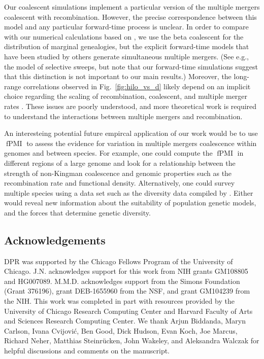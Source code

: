 \documentclass[11pt, letterpaper]{article}   	%
\newcommand{\fig}[1]{Fig.~\ref{#1}}
\DeclareMathOperator{\fpmi}{fPMI}
\begin{document}
Our coalescent simulations implement a particular version of the multiple mergers coalescent with recombination.
However, the precise correspondence between this model and any particular forward-time process is unclear.
In order to compare with our numerical calculations based on \textcite{BirknerEtAl2013}, we use the beta coalescent for the distribution of marginal genealogies, but the explicit forward-time models that have been studied by others generate simultaneous multiple mergers.
(See e.g., the \cite{DurrettSchweinsberg2005} model of selective sweeps, but note that our forward-time simulations suggest that this distinction is not important to our main results.)
Moreover, the long-range correlations observed in \fig{fig:hilo_vs_d} likely depend on an implicit choice regarding the scaling of recombination, coalescent, and multiple merger rates \autocite{EldonWakeley2006}.
These issues are poorly understood, and more theoretical work is required to understand the interactions between multiple mergers and recombination.

An interesteing potential future empircal application of our work would be to use $\fpmi$ to assess the evidence for variation in multiple mergers coalescence within genomes and between species.
For example, one could compute the $\fpmi$ in different regions of a large genome and look for a relationship between the strength of non-Kingman coalescence and genomic properties such as the recombination rate and functional density.
Alternatively, one could survey multiple species using a data set such as the diversity data compiled by \textcite{Corbett-DetigEtAl2015}.
Either would reveal new information about the suitability of population genetic models, and the forces that determine genetic diversity.

\subsection*{Acknowledgements}
DPR was supported by the Chicago Fellows Program of the University of Chicago.
J.N. acknowledges support for this work from NIH grants GM108805 and HG007089.
M.M.D. acknowledges support from the Simons Foundation (Grant 376196), grant DEB-1655960 from the NSF, and grant GM104239 from the NIH.
This work was completed in part with resources provided by the University of Chicago Research Computing Center and Harvard Faculty of Arts and Sciences Research Computing Center.
We thank
Arjun Biddanda,
Maryn Carlson,
Ivana Cvijovi\'c,
Ben Good,
Dick Hudson,
Evan Koch,
Joe Marcus,
Richard Neher,
Matthias Steinr\"ucken,
John Wakeley,
and Aleksandra Walczak for helpful discussions and comments on the manuscript.
\end{document}
